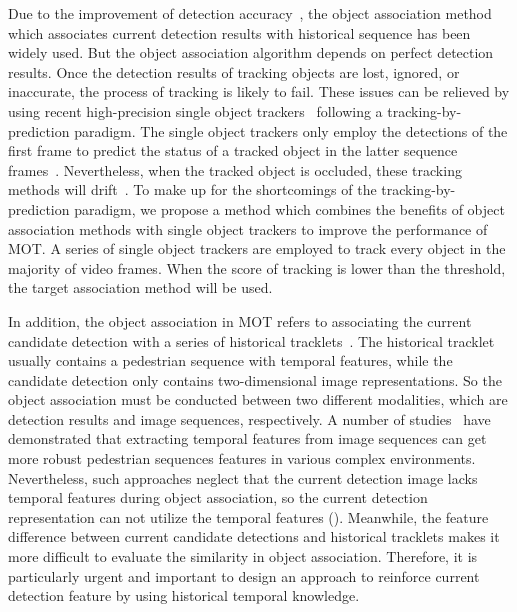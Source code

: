 \documentclass[times,twocolumn,final,authoryear]{elsarticle}
\begin{document}
Due to the improvement of detection accuracy~\citep{ren2017faster}, the object association method which associates current detection results with historical {sequence} has been widely used. 
But the object association algorithm depends on perfect detection results.
Once the detection results of tracking objects are lost, ignored, or inaccurate, the process of tracking is likely to fail. 
These issues can be relieved by using recent high-precision single object trackers~\citep{RN1215,RN1212,RN1214} following a tracking-by-prediction paradigm. 
The single object trackers only employ the detections of the first frame to predict the status of a tracked object in the latter sequence frames~\citep{li2016robust}. 
Nevertheless, when the tracked object is occluded, these tracking methods will drift~\citep{RN717,2021Person}. 
To make up for the shortcomings of the tracking-by-prediction paradigm, we propose a method which combines the benefits of object association methods with single object trackers to improve the performance of MOT. 
A series of single object trackers are employed to track every object in the majority of video frames. 
When the score of tracking is lower than the threshold, the target association method will be used.


In addition, the object association in MOT refers to associating the current candidate detection with a series of historical tracklets~\citep{RN994,RN724}.
The historical tracklet usually contains a pedestrian sequence with temporal features, while the candidate detection only contains two-dimensional image representations. 
So the object association must be conducted between two different {modalities}, which are detection results and image sequences, respectively.
A number of studies~\citep{RN969,RN970} have demonstrated that extracting temporal features from image sequences can get more robust pedestrian sequences features in various complex environments. 
Nevertheless, such approaches neglect that the current detection image lacks temporal features during object association, so the current detection representation can not utilize the temporal features (). 
Meanwhile, the feature difference between current candidate {detections} and historical tracklets makes it more difficult to evaluate the similarity in object association. 
Therefore, it is particularly urgent and important to design an approach to reinforce current detection feature by using historical temporal knowledge.
\end{document}
